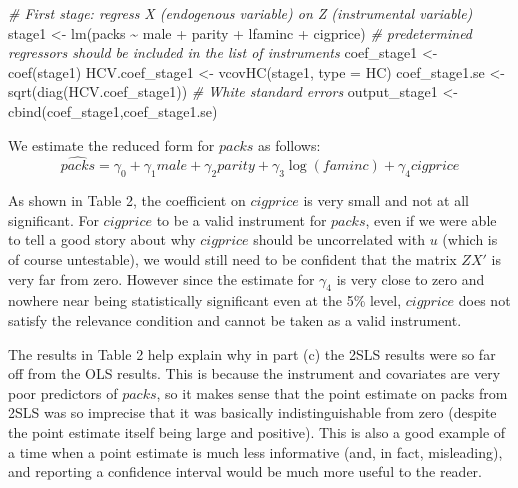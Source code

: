 \documentclass[
]{article}
\newenvironment{Shaded}{\begin{snugshade}}{\end{snugshade}}
\newcommand{\AttributeTok}[1]{\textcolor[rgb]{0.77,0.63,0.00}{#1}}
\newcommand{\CommentTok}[1]{\textcolor[rgb]{0.56,0.35,0.01}{\textit{#1}}}
\newcommand{\FunctionTok}[1]{\textcolor[rgb]{0.00,0.00,0.00}{#1}}
\newcommand{\NormalTok}[1]{#1}
\newcommand{\OtherTok}[1]{\textcolor[rgb]{0.56,0.35,0.01}{#1}}
\newcommand{\SpecialCharTok}[1]{\textcolor[rgb]{0.00,0.00,0.00}{#1}}
\newcommand{\StringTok}[1]{\textcolor[rgb]{0.31,0.60,0.02}{#1}}
\begin{document}
\begin{Shaded}
\begin{Highlighting}[]
\CommentTok{\# First stage: regress X (endogenous variable) on Z (instrumental variable)}
\NormalTok{stage1 }\OtherTok{\textless{}{-}} \FunctionTok{lm}\NormalTok{(packs }\SpecialCharTok{\textasciitilde{}}\NormalTok{ male }\SpecialCharTok{+}\NormalTok{ parity }\SpecialCharTok{+}\NormalTok{ lfaminc }\SpecialCharTok{+}\NormalTok{ cigprice)}
\CommentTok{\# predetermined regressors should be included in the list of instruments}
\NormalTok{coef\_stage1 }\OtherTok{\textless{}{-}} \FunctionTok{coef}\NormalTok{(stage1)}
\NormalTok{HCV.coef\_stage1 }\OtherTok{\textless{}{-}} \FunctionTok{vcovHC}\NormalTok{(stage1, }\AttributeTok{type =} \StringTok{\textquotesingle{}HC\textquotesingle{}}\NormalTok{)}
\NormalTok{coef\_stage1.se }\OtherTok{\textless{}{-}} \FunctionTok{sqrt}\NormalTok{(}\FunctionTok{diag}\NormalTok{(HCV.coef\_stage1)) }\CommentTok{\# White standard errors}
\NormalTok{output\_stage1 }\OtherTok{\textless{}{-}} \FunctionTok{cbind}\NormalTok{(coef\_stage1,coef\_stage1.se)}
\end{Highlighting}
\end{Shaded}

We estimate the reduced form for \(packs\) as follows:
\[ \hat{packs} = \gamma_0 + \gamma_1 male + \gamma_2 parity + \gamma_3 \log(faminc) +\gamma_4 cigprice \]

As shown in Table 2, the coefficient on \(cigprice\) is very small and
not at all significant. For \(cigprice\) to be a valid instrument for
\(packs\), even if we were able to tell a good story about why
\(cigprice\) should be uncorrelated with \(u\) (which is of course
untestable), we would still need to be confident that the matrix \(ZX'\)
is very far from zero. However since the estimate for \(\gamma_4\) is
very close to zero and nowhere near being statistically significant even
at the 5\% level, \(cigprice\) does not satisfy the relevance condition
and cannot be taken as a valid instrument.

The results in Table 2 help explain why in part (c) the 2SLS results
were so far off from the OLS results. This is because the instrument and
covariates are very poor predictors of \(packs\), so it makes sense that
the point estimate on packs from 2SLS was so imprecise that it was
basically indistinguishable from zero (despite the point estimate itself
being large and positive). This is also a good example of a time when a
point estimate is much less informative (and, in fact, misleading), and
reporting a confidence interval would be much more useful to the reader.
\end{document}
